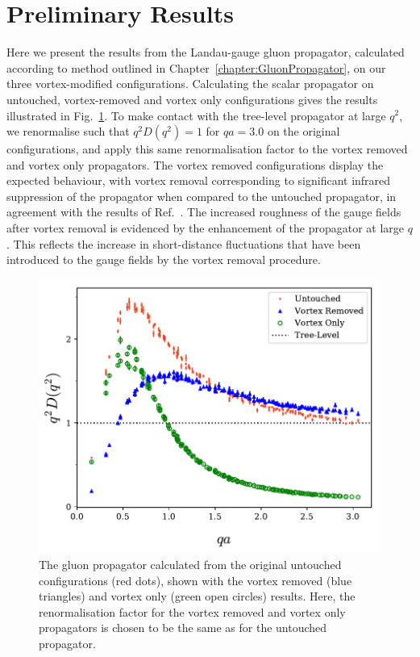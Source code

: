 \section{Preliminary Results}
Here we present the results from the Landau-gauge gluon propagator, calculated according to method outlined in Chapter~\ref{chapter:GluonPropagator}, on our three vortex-modified configurations. Calculating the scalar propagator on untouched, vortex-removed and vortex only configurations gives the results illustrated in Fig.~\ref{fig:NoCool}. To make contact with the tree-level propagator at large $q^2$, we renormalise such that $q^2D(q^2)=1$ for $qa = 3.0$ on the original configurations, and apply this same renormalisation factor to the vortex removed and vortex only propagators. The vortex removed configurations display the expected behaviour, with vortex removal corresponding to significant infrared suppression of the propagator when compared to the untouched propagator, in agreement with the results of Ref.~\cite{Bowman:2010zr}. The increased roughness of the gauge fields after vortex removal is evidenced by the enhancement of the propagator at large $q$. This reflects the increase in short-distance fluctuations that have been introduced to the gauge fields by the vortex removal procedure.\\
%
\begin{figure}[H]
\centering
\includegraphics[width=\linewidth]{./ScalarGluComp_q2_NoCoolSum.pdf}
\caption[The gluon propagator calculated from the original untouched configurations, shown with the vortex removed and vortex only results.]{\label{fig:NoCool}The gluon propagator calculated from the original untouched configurations (red dots), shown with the vortex removed (blue triangles) and vortex only (green open circles) results. Here, the renormalisation factor for the vortex removed and vortex only propagators is chosen to be the same as for the untouched propagator.}
\end{figure}
%

